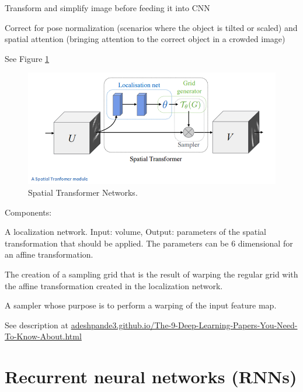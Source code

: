 \documentclass[english]{article}
\begin{document}
Transform and simplify image before feeding it into CNN

Correct for pose normalization (scenarios where the object is tilted or scaled) and spatial attention (bringing attention to the correct object in a crowded image)

 See Figure \ref{STN}

\begin{figure}
  \centering
  \includegraphics[scale=0.6]{SpatialTransformer}
  \caption{Spatial Transformer Networks.}
  \label{STN}
\end{figure}

Components: 

A localization network. Input: volume, Output: parameters of the spatial transformation that should be applied. The parameters can be 6 dimensional for an affine transformation.

The creation of a sampling grid that is the result of warping the regular grid with the affine transformation created in the localization network.

A sampler whose purpose is to perform a warping of the input feature map.

See description at \url{adeshpande3.github.io/The-9-Deep-Learning-Papers-You-Need-To-Know-About.html}
\eenum 







\section{Recurrent neural networks (RNNs)}
\end{document}
